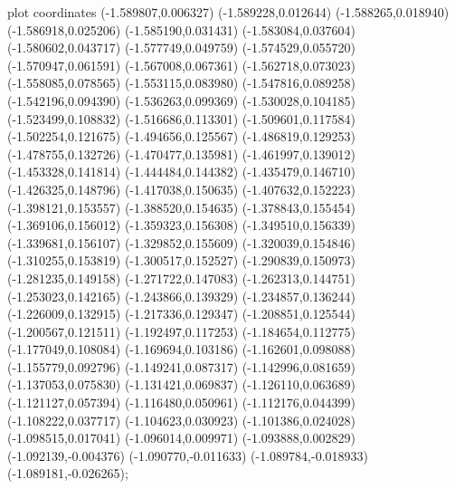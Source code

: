 { plot coordinates {(-1.589807,0.006327) (-1.589228,0.012644) (-1.588265,0.018940) (-1.586918,0.025206) (-1.585190,0.031431) (-1.583084,0.037604) (-1.580602,0.043717) (-1.577749,0.049759) (-1.574529,0.055720) (-1.570947,0.061591) (-1.567008,0.067361) (-1.562718,0.073023) (-1.558085,0.078565) (-1.553115,0.083980) (-1.547816,0.089258) (-1.542196,0.094390) (-1.536263,0.099369) (-1.530028,0.104185) (-1.523499,0.108832) (-1.516686,0.113301) (-1.509601,0.117584) (-1.502254,0.121675) (-1.494656,0.125567) (-1.486819,0.129253) (-1.478755,0.132726) (-1.470477,0.135981) (-1.461997,0.139012) (-1.453328,0.141814) (-1.444484,0.144382) (-1.435479,0.146710) (-1.426325,0.148796) (-1.417038,0.150635) (-1.407632,0.152223) (-1.398121,0.153557) (-1.388520,0.154635) (-1.378843,0.155454) (-1.369106,0.156012) (-1.359323,0.156308) (-1.349510,0.156339) (-1.339681,0.156107) (-1.329852,0.155609) (-1.320039,0.154846) (-1.310255,0.153819) (-1.300517,0.152527) (-1.290839,0.150973) (-1.281235,0.149158) (-1.271722,0.147083) (-1.262313,0.144751) (-1.253023,0.142165) (-1.243866,0.139329) (-1.234857,0.136244) (-1.226009,0.132915) (-1.217336,0.129347) (-1.208851,0.125544) (-1.200567,0.121511) (-1.192497,0.117253) (-1.184654,0.112775) (-1.177049,0.108084) (-1.169694,0.103186) (-1.162601,0.098088) (-1.155779,0.092796) (-1.149241,0.087317) (-1.142996,0.081659) (-1.137053,0.075830) (-1.131421,0.069837) (-1.126110,0.063689) (-1.121127,0.057394) (-1.116480,0.050961) (-1.112176,0.044399) (-1.108222,0.037717) (-1.104623,0.030923) (-1.101386,0.024028) (-1.098515,0.017041) (-1.096014,0.009971) (-1.093888,0.002829) (-1.092139,-0.004376) (-1.090770,-0.011633) (-1.089784,-0.018933) (-1.089181,-0.026265)};
}
